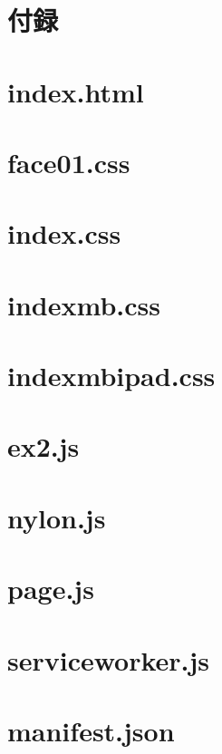 \documentclass[a4j,12pt]{jarticle}
\begin{document}
\newpage
{}
\appendix
\section*{付録}
\section*{index.html}
\label{index.html}
\newpage
\section*{face01.css}
\label{face01.css}
\newpage
\section*{index.css}
\label{index.css}
\newpage

\section*{indexmb.css}
\label{indexmb.css}
\newpage

\section*{indexmbipad.css}
\label{indexmbipad.css}
\newpage

\section*{ex2.js}
\label{ex2.js}
\newpage

\section*{nylon.js}
\label{nylon.js}
\newpage

\section*{page.js}
\label{page.js}
\newpage

\section*{serviceworker.js}
\label{serviceworker.js}
\newpage

\section*{manifest.json}
\label{manifest.json}
\newpage
\end{document}
